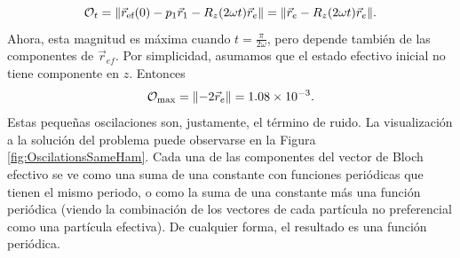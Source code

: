 \begin{equation}
    \mathcal{O}_{t}=\norm{\vec{r}_{\text{ef}}(0)-p_{1}\vec{r}_{1}-R_{z}(2\omega t)\vec{r}_{e}}=\norm{\vec{r}_{e}-R_{z}(2\omega t)\vec{r}_{e}}\nonumber.
\end{equation}
Ahora, esta magnitud es máxima cuando $t=\frac{\pi}{2\omega}$, pero depende también de las componentes de $\vec{r}_{ef}$. Por simplicidad, asumamos que el estado efectivo inicial no tiene componente en $z$. Entonces
\begin{equation}
    \mathcal{O}_{\max}=\norm{-2\vec{r}_{e}}=1.08\times 10^{-3}\nonumber.
\end{equation}
Estas pequeñas oscilaciones son, justamente, el término de ruido. La visualización a la solución del problema puede observarse en la Figura \ref{fig:OscilationsSameHam}. Cada una de las componentes del vector de Bloch efectivo se ve como una suma de una constante con funciones periódicas que tienen el mismo periodo, o  como la suma de una constante más una función periódica (viendo la combinación de los vectores de cada partícula no preferencial como una partícula efectiva). De cualquier forma, el resultado es una función periódica.

